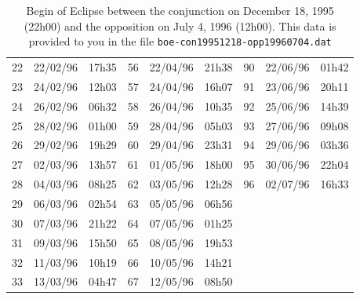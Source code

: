 \documentclass{tufte-handout}
\begin{document}
\begin{table}
\begin{tabular}{lll|lll|lll}
22 & 22/02/96 & 17h35 & 56 & 22/04/96 & 21h38 & 90 & 22/06/96 & 01h42\\
23 & 24/02/96 & 12h03 & 57 & 24/04/96 & 16h07 & 91 & 23/06/96 & 20h11\\
24 & 26/02/96 & 06h32 & 58 & 26/04/96 & 10h35 & 92 & 25/06/96 & 14h39\\
25 & 28/02/96 & 01h00 & 59 & 28/04/96 & 05h03 & 93 & 27/06/96 & 09h08\\
26 & 29/02/96 & 19h29 & 60 & 29/04/96 & 23h31 & 94 & 29/06/96 & 03h36\\
27 & 02/03/96 & 13h57 & 61 & 01/05/96 & 18h00 & 95 & 30/06/96 & 22h04\\
28 & 04/03/96 & 08h25 & 62 & 03/05/96 & 12h28 & 96 & 02/07/96 & 16h33\\
29 & 06/03/96 & 02h54 & 63 & 05/05/96 & 06h56 & & &\\
30 & 07/03/96 & 21h22 & 64 & 07/05/96 & 01h25 & & &\\
31 & 09/03/96 & 15h50 & 65 & 08/05/96 & 19h53 & & & \\
32 & 11/03/96 & 10h19 & 66 & 10/05/96 & 14h21 & & &\\
33 & 13/03/96 & 04h47 & 67 & 12/05/96 & 08h50 & & &\\
\end{tabular}
\caption{Begin of Eclipse between the conjunction on December 18, 1995 (22h00) and the opposition on July 4, 1996 (12h00). This data is provided to you in the file {\tt boe-con19951218-opp19960704.dat}}
\end{table}
\end{document}
